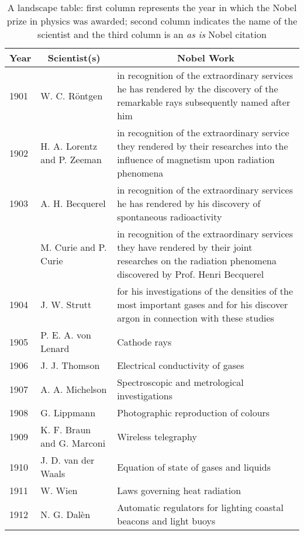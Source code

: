 \begin{landscape}
  \begin{table}[hbt]
    \caption{A landscape table: 
      first column represents the year in which the Nobel prize in 
      physics was awarded; second column indicates the name of the 
      scientist and the third column is an \textsl{as is} Nobel
      citation}
    \begin{center}
      \begin{tabular}{p{0.40in}p{2.30in}p{4.85in}}
        \hline
        \multicolumn{1}{c}{\textbf{Year}} &
        \multicolumn{1}{c}{\textbf{Scientist(s)}} &
        \multicolumn{1}{c}{\textbf{Nobel Work}}\\
        \hline
        1901 & W. C. R\"{o}ntgen           & in recognition of the extraordinary services he has rendered by the discovery of the remarkable rays subsequently named after him\\
        1902 & H. A. Lorentz and P. Zeeman & in recognition of the extraordinary service they rendered by their researches into the influence of magnetism upon radiation phenomena\\
        1903 & A. H. Becquerel             & in recognition of the extraordinary services he has rendered by his discovery of spontaneous radioactivity\\
             & M. Curie and P. Curie       & in recognition of the extraordinary services they have rendered by their joint researches on the radiation phenomena discovered by Prof. Henri Becquerel\\
        1904 & J. W. Strutt                & for his investigations of the densities of the most important gases and for his discover argon in connection with these studies\\
        1905 & P. E. A. von Lenard         & Cathode rays\\
        1906 & J. J. Thomson               & Electrical conductivity of gases\\
        1907 & A. A. Michelson             & Spectroscopic and metrological investigations\\
        1908 & G. Lippmann                 & Photographic reproduction of colours\\
        1909 & K. F. Braun and G. Marconi  & Wireless telegraphy\\
        1910 & J. D. van der Waals         & Equation of state of gases and liquids\\
        1911 & W. Wien                     & Laws governing heat radiation\\
        1912 & N. G. Dal\`{e}n             & Automatic regulators for lighting coastal beacons and light buoys\\
        \hline
      \end{tabular}
      \label{CHAPTER3_TABLE02}
    \end{center}
  \end{table}
\end{landscape}

